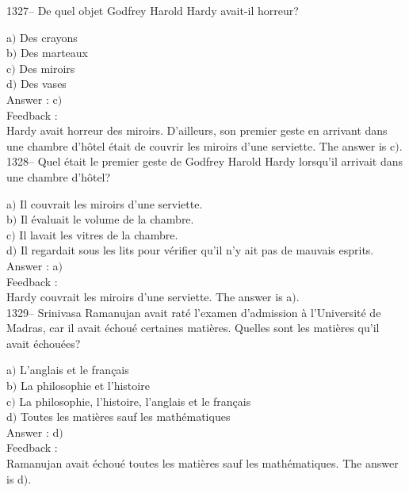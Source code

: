 ﻿\documentclass[letterpaper, 12pt]{article}
\begin{document}
1327-- De quel objet Godfrey Harold Hardy avait-il horreur?

a$)$ Des crayons \\
b$)$ Des marteaux \\
c$)$ Des miroirs \\
d$)$ Des vases\\

Answer : c$)$\\

Feedback : \\
Hardy avait horreur des miroirs. D'ailleurs, son premier geste en
arrivant dans une chambre d'h\^otel \'etait de couvrir les miroirs
d'une serviette.
The answer is  c$)$.\\

1328-- Quel \'etait le premier geste de Godfrey Harold Hardy
lorsqu'il arrivait dans une chambre d'h\^otel?

a$)$ Il couvrait les miroirs d'une serviette. \\
b$)$ Il \'evaluait le volume de la chambre. \\
c$)$ Il lavait les vitres de la chambre. \\
d$)$ Il regardait sous les lits pour v\'erifier qu'il n'y ait pas de mauvais
esprits.\\

Answer : a$)$\\

Feedback : \\
Hardy couvrait les miroirs d'une serviette.
The answer is  a$)$.\\

1329-- Srinivasa Ramanujan avait rat\'e l'examen d'admission \`a
l'Universit\'e de Madras, car il avait \'echou\'e certaines
mati\`eres. Quelles sont les mati\`eres qu'il avait \'echou\'ees?

a$)$ L'anglais et le fran\c cais \\
b$)$ La philosophie et l'histoire \\
c$)$ La philosophie, l'histoire, l'anglais et le fran\c cais \\
d$)$ Toutes les mati\`eres sauf les math\'ematiques\\

Answer : d$)$\\

Feedback : \\
Ramanujan avait \'echou\'e toutes les mati\`eres sauf les
math\'ematiques.
The answer is  d$)$.\\
\end{document}
